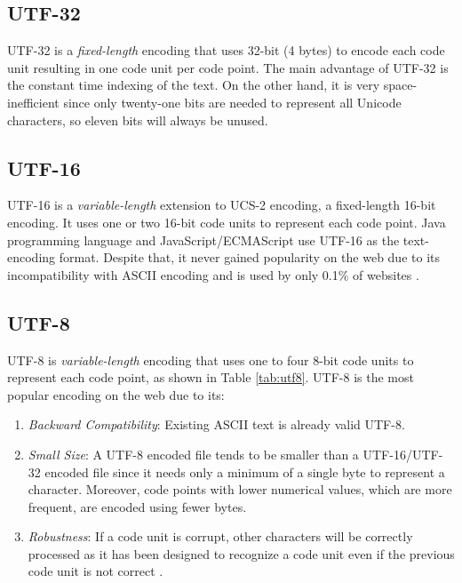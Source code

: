 \subsection{UTF-32}
UTF-32 is a \textit{fixed-length} encoding that uses 32-bit (4 bytes) to encode each code unit resulting in one code unit per code point. The main advantage of UTF-32 is the constant time indexing of the text. On the other hand, it is very space-inefficient since only twenty-one bits are needed to represent all Unicode characters, so eleven bits will always be unused.

\subsection{UTF-16}
UTF-16 is a \textit{variable-length} extension to UCS-2 encoding, a fixed-length 16-bit encoding. It uses one or two 16-bit code units to represent each code point. Java programming language and JavaScript/ECMAScript use UTF-16 as the text-encoding format. Despite that, it never gained popularity on the web due to its incompatibility with ASCII encoding and is used by only 0.1\% of websites \cite{utf16usage}.

\subsection{UTF-8}
UTF-8 is \textit{variable-length} encoding that uses one to four 8-bit code units to represent each code point, as shown in Table \ref{tab:utf8}. UTF-8 is the most popular encoding on the web \cite{utf8usage} due to its:
\begin{enumerate}
    \item \textit{Backward Compatibility}: Existing ASCII text is already valid UTF-8.
    \item \textit{Small Size}: A UTF-8 encoded file tends to be smaller than a UTF-16/UTF-32 encoded file since it needs only a minimum of a single byte to represent a character. Moreover, code points with lower numerical values, which are more frequent, are encoded using fewer bytes.
    \item \textit{Robustness}: If a code unit is corrupt, other characters will be correctly processed as it has been designed to recognize a code unit even if the previous code unit is not correct \cite{unicodeexplainedbook}.
\end{enumerate}

\newcommand\rownumberx{\stepcounter{magicrownumbersx}\arabic{magicrownumbersx}}


